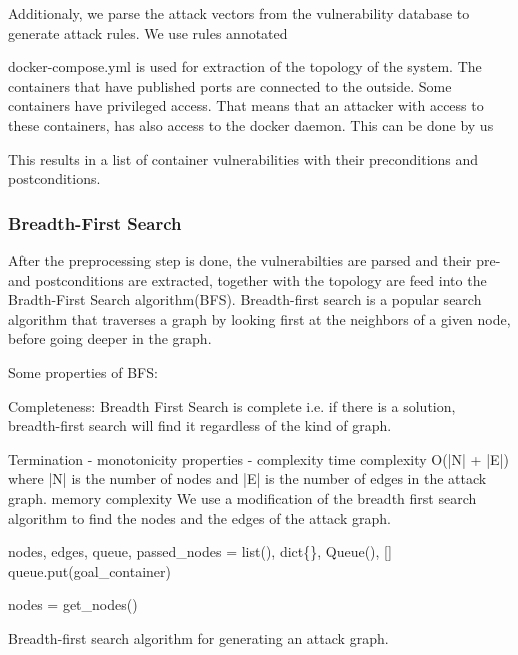 \documentclass[letterpaper, 10 pt, conference]{ieeeconf}  %
\begin{document}
Additionaly, we parse the attack vectors from the vulnerability database to generate attack rules. We use rules annotated

docker-compose.yml is used for extraction of the topology of the system. The containers that have published ports are connected to the outside.
Some containers have privileged access. That means that an attacker with access to these containers, has also access to the docker daemon. This can be done by us

This results in a list of container vulnerabilities with their preconditions and postconditions.
\subsubsection{Breadth-First Search}

After the preprocessing step is done, the vulnerabilties are parsed and their pre- and postconditions are extracted, together with the topology are feed into the Bradth-First Search algorithm(BFS).
Breadth-first search is a popular search algorithm that traverses a graph by looking first at the neighbors of a given node, before going deeper in the graph.

Some properties of BFS:

Completeness: Breadth First Search is complete i.e. if there is a solution, breadth-first search will find it regardless of the kind of graph.

Termination - monotonicity properties
- complexity
time complexity O(|N| + |E|) where |N| is the number of nodes and |E| is the number of edges in the attack graph.
memory complexity
We use a modification of the breadth first search algorithm to find the nodes and the edges of the attack graph.
\begin{algorithm}
	\SetAlgoLined
	nodes, edges, queue, passed\_nodes = list(), dict\{\}, Queue(), []\;
	queue.put(goal\_container)\;
	
	nodes = get\_nodes()\;

\caption{Breadth-first search algorithm for generating an attack graph.}
\end{algorithm}
\end{document}
